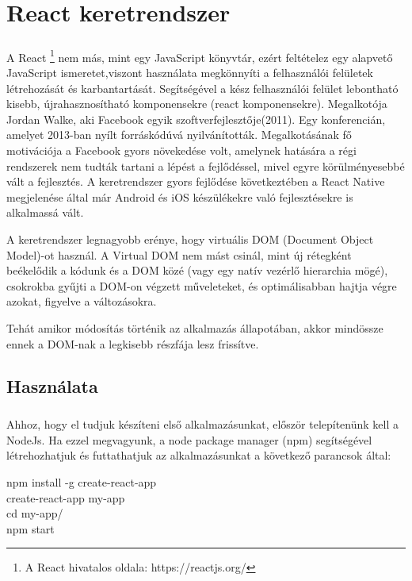 \chapter{React keretrendszer}\label{ch:progik}

\paragraph{}
A React \footnote{A React hivatalos oldala: https://reactjs.org/} nem más, mint egy JavaScript könyvtár, ezért feltételez egy alapvető JavaScript ismeretet,viszont használata megkönnyíti a felhasználói felületek létrehozását és karbantartását. Segítségével a kész felhasználói felület lebontható kisebb, újrahasznosítható komponensekre (react komponensekre). Megalkotója Jordan Walke, aki Facebook egyik szoftverfejlesztője(2011). Egy konferencián, amelyet 2013-ban nyílt forráskódúvá nyilvánították. Megalkotásának fő motivációja a Facebook gyors növekedése volt, amelynek hatására a régi rendszerek nem tudták tartani a lépést a fejlődéssel, mivel egyre körülményesebbé vált a fejlesztés. A keretrendszer gyors fejlődése következtében a React Native megjelenése által már Android és iOS készülékekre való fejlesztésekre is alkalmassá vált. 

A keretrendszer legnagyobb erénye, hogy virtuális DOM (Document Object Model)-ot használ. A Virtual DOM nem mást csinál, mint új rétegként beékelődik a kódunk és a DOM közé (vagy egy natív vezérlő hierarchia mögé), csokrokba gyűjti a DOM-on végzett műveleteket, és optimálisabban hajtja végre azokat, figyelve a változásokra.

Tehát amikor módosítás történik az alkalmazás állapotában, akkor mindössze ennek a DOM-nak a legkisebb részfája lesz frissítve.

\section{Használata}
\paragraph{}
Ahhoz, hogy el tudjuk készíteni első alkalmazásunkat, először telepítenünk kell a NodeJs. Ha ezzel megvagyunk, a node package manager (npm) segítségével létrehozhatjuk és futtathatjuk az alkalmazásunkat a következő parancsok által:
\begin{center}
npm install -g create-react-app \\
create-react-app my-app  \\
cd my-app/  \\ 
npm start \\
\end{center}

